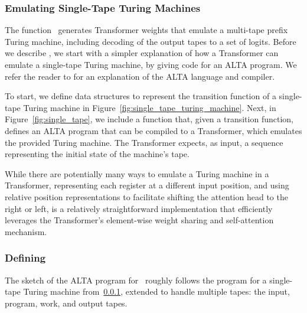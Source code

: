 \subsubsection{Emulating Single-Tape Turing Machines}
\label{sec:single-tape-alta-program}

The function \zmap~generates Transformer weights that emulate a multi-tape prefix Turing machine, including decoding of the output tapes to a set of logits. Before we describe \zmap, we start with a simpler explanation of how a Transformer can emulate a single-tape Turing machine, by giving code for an ALTA program. We refer the reader to \citet{shaw2024alta} for an explanation of the ALTA language and compiler. 




To start, we define data structures to represent the transition function of a single-tape Turing machine in Figure~\ref{fig:single_tape_turing_machine}. Next, in Figure~\ref{fig:single_tape}, we include a function that, given a transition function, defines an ALTA program that can be compiled to a Transformer, which emulates the provided Turing machine. The Transformer expects, as input, a sequence representing the initial state of the machine's tape.

While there are potentially many ways to emulate a Turing machine in a Transformer, representing each register at a different input position, and using relative position representations to facilitate shifting the attention head to the right or left, is a relatively straightforward implementation that efficiently leverages the Transformer's element-wise weight sharing and self-attention mechanism.

\subsubsection{Defining \zmap}

The sketch of the ALTA program for \zmap~roughly follows the program for a single-tape Turing machine from~\ref{sec:single-tape-alta-program}, extended to handle multiple tapes: the input, program, work, and output tapes.


